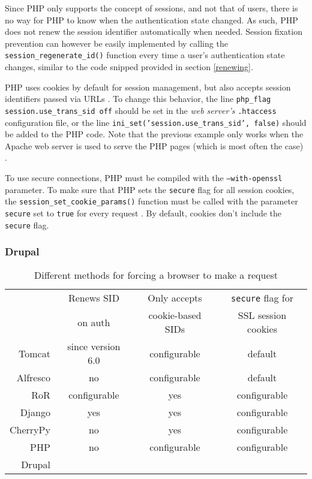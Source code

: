 Since PHP only supports the concept of sessions, and not that of users, there is no way for PHP to know when the authentication state changed. As such, PHP does not renew the session identifier automatically when needed. Session fixation prevention can however be easily implemented by calling the \texttt{session\_regenerate\_id()} function every time a user's authentication state changes, similar to the code snipped provided in section \ref{renewing}.

PHP uses cookies by default for session management, but also accepts session identifiers passed via URLs  \cite{Holovaty2008}. To change this behavior, the line \texttt{php\_flag session.use\_trans\_sid\ off} should be set in the \emph{web server's} \texttt{.htaccess} configuration file, or the line \texttt{ini\_set('session.use\_trans\_sid', false)} should be added to the PHP code. Note that the previous example only works when the Apache web server is used to serve the PHP pages (which is most often the case) \cite{PHPdisableURL}.

To use secure connections, PHP must be compiled with the \texttt{--with-openssl} parameter. To make sure that PHP sets the \texttt{secure} flag for all session cookies, the \texttt{session\_set\_cookie\_params()} function must be called with the parameter \texttt{secure} set to \texttt{true} for every request \cite{PHPsessionCookieParams}. By default, cookies don't include the \texttt{secure} flag.

\subsubsection{Drupal}




\begin{table}[ht]
	\centering
	\begin{tabular*}{0.75\textwidth}{r|ccc}
		& Renews SID & Only accepts & \texttt{secure} flag for\\
		& on auth & cookie-based SIDs & SSL session cookies\\
		\hline
		Tomcat & since version 6.0 & configurable & default\\
		Alfresco & no & configurable & default\\
		RoR & configurable & yes & configurable\\
		Django & yes & yes & configurable\\
		CherryPy & no & yes & configurable\\
		PHP & no & configurable & configurable\\
		Drupal & & &\\
	\end{tabular*}
	\caption{Different methods for forcing a browser to make a request}
	\label{tab:forcing-request}
\end{table}

